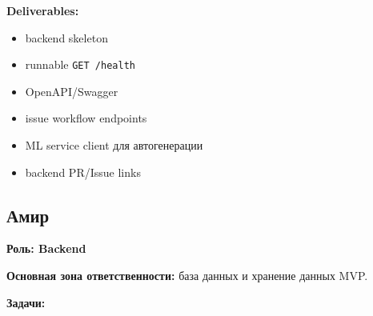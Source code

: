 \documentclass[12pt,a4paper]{article}
\begin{document}
\textbf{Deliverables:}
\begin{itemize}
    \item backend skeleton
    \item runnable \texttt{GET /health}
    \item OpenAPI/Swagger
    \item issue workflow endpoints
    \item ML service client для автогенерации
    \item backend PR/Issue links
\end{itemize}

\subsection{Амир}

\textbf{Роль: Backend}

\textbf{Основная зона ответственности:} база данных и хранение данных MVP.

\textbf{Задачи:}
\end{document}
